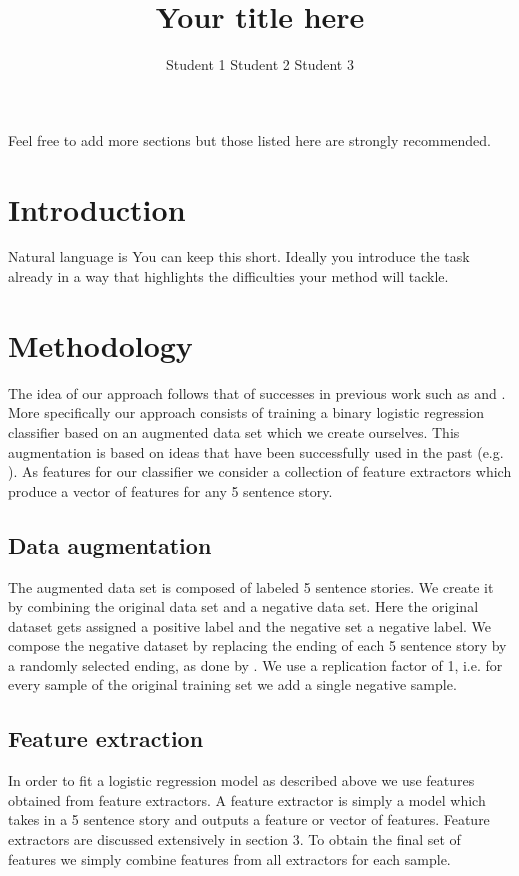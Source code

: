\documentclass{article}
\title{Your title here}
\author{Student 1 \qquad Student 2 \qquad Student 3}
\begin{document}

\maketitle


Feel free to add more sections but those listed here are strongly recommended.
\section{Introduction}
Natural language is
You can keep this short. Ideally you introduce the task already in a way that highlights the difficulties  your method will tackle.
\section{Methodology}
The idea of our approach follows that of successes in previous work such as \cite{UWNLP} and \cite{COGCOMP}. More specifically our approach consists of training a binary logistic regression classifier based on an augmented data set which we create ourselves. This augmentation is based on ideas that have been successfully used in the past (e.g. \cite{LSTMClassifier}). As features for our classifier we consider a collection of feature extractors which produce a vector of features for any 5 sentence story.

\subsection{Data augmentation}
The augmented data set is composed of labeled 5 sentence stories. We create it by combining the original data set and a negative data set. Here the original dataset gets assigned a positive label and the negative set a negative label. We compose the negative dataset by replacing the ending of each 5 sentence story by a randomly selected ending, as done by \cite{LSTMClassifier}. We use a replication factor of 1, i.e. for every sample of the original training set we add a single negative sample.

\subsection{Feature extraction}
In order to fit a logistic regression model as described above we use features obtained from feature extractors. A feature extractor is simply a model which takes in a 5 sentence story and outputs a feature or vector of features. Feature extractors are discussed extensively in section 3. To obtain the final set of features we simply combine features from all extractors for each sample.
\end{document}
